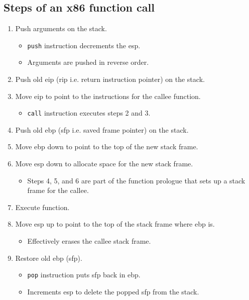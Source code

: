 \subsection{Steps of an x86 function call}
\begin{enumerate}
    \item Push arguments on the stack.
    \begin{itemize}
        \item \texttt{push} instruction decrements the esp.
        \item Arguments are pushed in reverse order.
    \end{itemize}
    
    \item Push old eip (rip i.e. return instruction pointer) on the stack.
    
    \item Move eip to point to the instructions for the callee function.
    \begin{itemize}
        \item \texttt{call} instruction executes steps 2 and 3.
    \end{itemize}
    
    \item Push old ebp (sfp i.e. saved frame pointer) on the stack.
    
    \item Move ebp down to point to the top of the new stack frame.
    
    \item Move esp down to allocate space for the new stack frame.
    \begin{itemize}
        \item Steps 4, 5, and 6 are part of the function prologue that sets up a stack frame for the callee.
    \end{itemize}
    
    \item Execute function.
    
    \item Move esp up to point to the top of the stack frame where ebp is.
    \begin{itemize}
        \item Effectively erases the callee stack frame.
    \end{itemize}
    
    \item Restore old ebp (sfp).
    \begin{itemize}
        \item \texttt{pop} instruction puts sfp back in ebp.
        \item Increments esp to delete the popped sfp from the stack.
    \end{itemize}
    

\end{enumerate}
